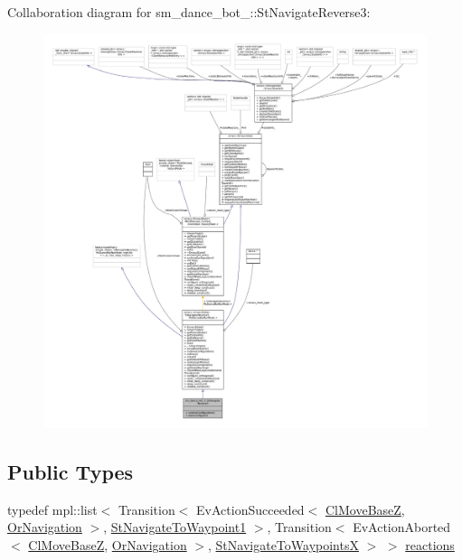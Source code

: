 Collaboration diagram for sm\+\_\+dance\+\_\+bot\+\_\+:\+:St\+Navigate\+Reverse3\+:
\nopagebreak
\begin{figure}[H]
\begin{center}
\leavevmode
\includegraphics[width=350pt]{structsm__dance__bot__3_1_1StNavigateReverse3__coll__graph}
\end{center}
\end{figure}
\subsection*{Public Types}
\begin{DoxyCompactItemize}
\item 
typedef mpl\+::list$<$ Transition$<$ Ev\+Action\+Succeeded$<$ \hyperlink{classmove__base__z__client_1_1ClMoveBaseZ}{Cl\+Move\+BaseZ}, \hyperlink{classsm__dance__bot__3_1_1OrNavigation}{Or\+Navigation} $>$, \hyperlink{structsm__dance__bot__3_1_1StNavigateToWaypoint1}{St\+Navigate\+To\+Waypoint1} $>$, Transition$<$ Ev\+Action\+Aborted$<$ \hyperlink{classmove__base__z__client_1_1ClMoveBaseZ}{Cl\+Move\+BaseZ}, \hyperlink{classsm__dance__bot__3_1_1OrNavigation}{Or\+Navigation} $>$, \hyperlink{structsm__dance__bot__3_1_1StNavigateToWaypointsX}{St\+Navigate\+To\+WaypointsX} $>$ $>$ \hyperlink{structsm__dance__bot__3_1_1StNavigateReverse3_a7c5eacc178ac24b22c600d6b04fbc0fb}{reactions}
\end{DoxyCompactItemize}
